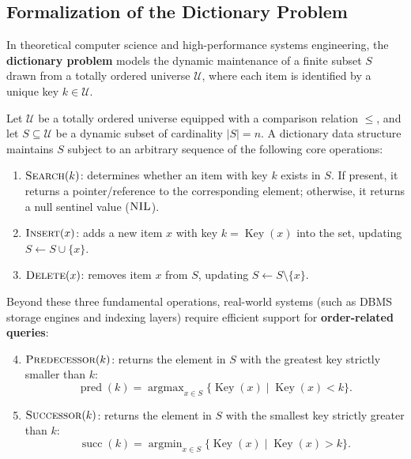 \subsection{Formalization of the Dictionary Problem}
In theoretical computer science and high-performance systems engineering, the \textbf{dictionary problem} models the dynamic maintenance of a finite subset $S$ drawn from a totally ordered universe $\mathcal{U}$, where each item is identified by a unique key $k \in \mathcal{U}$.

\begin{definition}
Let $\mathcal{U}$ be a totally ordered universe equipped with a comparison relation $\le$, and let $S \subseteq \mathcal{U}$ be a dynamic subset of cardinality $|S| = n$. A dictionary data structure maintains $S$ subject to an arbitrary sequence of the following core operations:
\begin{enumerate}
  \item $\textsc{Search}(k)$: determines whether an item with key $k$ exists in $S$. If present, it returns a pointer/reference to the corresponding element; otherwise, it returns a null sentinel value ($\textsc{NIL}$).
  \item $\textsc{Insert}(x)$: adds a new item $x$ with key $k = \operatorname{Key}(x)$ into the set, updating $S \leftarrow S \cup \{x\}$.
  \item $\textsc{Delete}(x)$: removes item $x$ from $S$, updating $S \leftarrow S \setminus \{x\}$.
\end{enumerate}
Beyond these three fundamental operations, real-world systems (such as DBMS storage engines and indexing layers) require efficient support for \textbf{order-related queries}:
\begin{enumerate}
  \setcounter{enumi}{3}
  \item $\textsc{Predecessor}(k)$: returns the element in $S$ with the greatest key strictly smaller than $k$:
  \begin{equation}
    \operatorname{pred}(k) = \operatorname{argmax}_{x \in S} \{\operatorname{Key}(x) \mid \operatorname{Key}(x) < k\}.
  \end{equation}
  \item $\textsc{Successor}(k)$: returns the element in $S$ with the smallest key strictly greater than $k$:
  \begin{equation}
    \operatorname{succ}(k) = \operatorname{argmin}_{x \in S} \{\operatorname{Key}(x) \mid \operatorname{Key}(x) > k\}.
  \end{equation}
\end{enumerate}
\end{definition}


